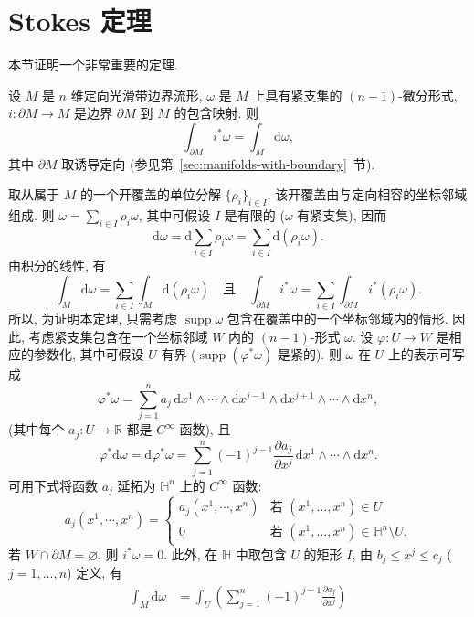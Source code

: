 \section{Stokes 定理}\label{sec:stokes-theorem}

本节证明一个非常重要的定理.

\begin{RiemannTheorem}[Stokes]\label{thm:stokes}
设 $M$ 是 $n$ 维定向光滑带边界流形, $\omega$ 是 $M$ 上具有紧支集的 $(n-1)$-微分形式, $i:\partial M\to M$ 是边界 $\partial M$ 到 $M$ 的包含映射. 则
\[
  \int_{\partial M}i^*\omega=\int_M\mathrm{d}\omega,
\]
其中 $\partial M$ 取诱导定向 (参见第~\ref{sec:manifolds-with-boundary}~节).
\end{RiemannTheorem}

\begin{RiemannProof}
取从属于 $M$ 的一个开覆盖的单位分解 $\{\rho_i\}_{i\in I}$, 该开覆盖由与定向相容的坐标邻域组成. 则 $\omega=\sum_{i\in I}\rho_i\omega$, 其中可假设 $I$ 是有限的 ($\omega$ 有紧支集), 因而
\[
  \mathrm{d}\omega=\mathrm{d}\sum_{i\in I}\rho_i\omega
  =\sum_{i\in I}\mathrm{d}(\rho_i\omega).
\]
由积分的线性, 有
\[
  \int_M\mathrm{d}\omega=\sum_{i\in I}\int_M\mathrm{d}(\rho_i\omega)
  \quad\text{且}\quad
  \int_{\partial M}i^*\omega=\sum_{i\in I}\int_{\partial M}i^*(\rho_i\omega).
\]
所以, 为证明本定理, 只需考虑 $\operatorname{supp}\omega$ 包含在覆盖中的一个坐标邻域内的情形. 因此, 考虑紧支集包含在一个坐标邻域 $W$ 内的 $(n-1)$-形式 $\omega$. 设 $\varphi:U\to W$ 是相应的参数化, 其中可假设 $U$ 有界 ($\operatorname{supp}(\varphi^*\omega)$ 是紧的). 则 $\omega$ 在 $U$ 上的表示可写成
\[
  \varphi^*\omega=\sum_{j=1}^na_j\,\mathrm{d}x^1\wedge\cdots\wedge
  \mathrm{d}x^{j-1}\wedge\mathrm{d}x^{j+1}\wedge\cdots\wedge\mathrm{d}x^n,
\]
(其中每个 $a_j:U\to\mathbb{R}$ 都是 $C^\infty$ 函数), 且
\[
  \varphi^*\mathrm{d}\omega=\mathrm{d}\varphi^*\omega
  =\sum_{j=1}^n(-1)^{j-1}\frac{\partial a_j}{\partial x^j}
    \,\mathrm{d}x^1\wedge\cdots\wedge\mathrm{d}x^n.
\]
可用下式将函数 $a_j$ 延拓为 $\mathbb{H}^n$ 上的 $C^\infty$ 函数:
\[
  a_j(x^1,\cdots,x^n)=
  \begin{cases}
    a_j(x^1,\cdots,x^n)&\text{若 }(x^1,\ldots,x^n)\in U\\
    0&\text{若 }(x^1,\ldots,x^n)\in\mathbb{H}^n\setminus U.
  \end{cases}
\]
若 $W\cap\partial M=\varnothing$, 则 $i^*\omega=0$. 此外, 在 $\mathbb{H}$ 中取包含 $U$ 的矩形 $I$, 由 $b_j\leq x^j\leq c_j$ ($j=1,\ldots,n$) 定义, 有
\begin{align*}
  \int_M\mathrm{d}\omega
  &=\int_U\left(\sum_{j=1}^n(-1)^{j-1}\frac{\partial a_j}{\partial x^j}\right)

\end{align*}
\end{RiemannProof}
